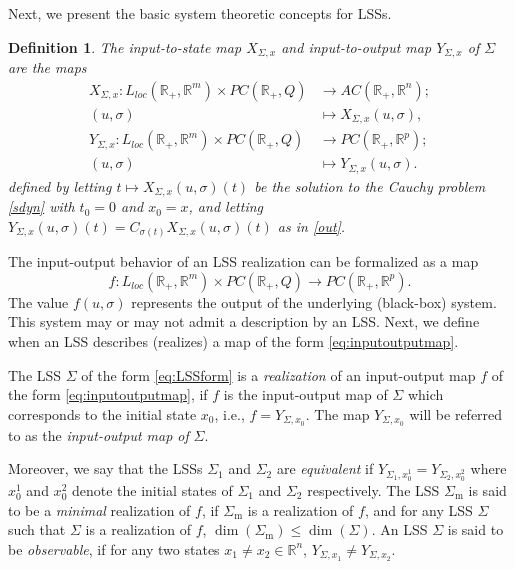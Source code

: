 \documentclass[journal]{IEEEtran}
\newtheorem{Definition}{Definition}
\begin{document}
Next, we present the basic system theoretic concepts for LSSs.

\begin{Definition}\label{def:stateandoutput}
The \emph{input-to-state} map $X_{\Sigma,x}$ and \emph{input-to-output} map $Y_{\Sigma,x}$ of $\Sigma$ are the maps 
	\begin{align*}
		X_{\Sigma,x}: L_{loc}(\mathbb{R}_+,\mathbb{R}^m) \times PC(\mathbb{R}_+,Q) & \rightarrow AC(\mathbb{R}_+,\mathbb{R}^n); \\
		(u,\sigma) & \mapsto X_{\Sigma,x}(u,\sigma), \\ 
		Y_{\Sigma,x}: L_{loc}(\mathbb{R}_+,\mathbb{R}^m) \times PC(\mathbb{R}_+,Q) & \rightarrow PC(\mathbb{R}_+,\mathbb{R}^p); \\
		(u,\sigma) & \mapsto Y_{\Sigma,x}(u,\sigma).
	\end{align*}
	defined by letting $t\mapsto X_{\Sigma,x}(u,\sigma)(t)$ be the solution to the Cauchy problem \eqref{sdyn} with $t_0=0$ and $x_0=x$, and letting $Y_{\Sigma,x}(u,\sigma)(t)=C_{\sigma(t)}X_{\Sigma,x}(u,\sigma)(t)$ as in \eqref{out}.
\end{Definition}

The input-output behavior of an LSS realization can be formalized as a map
\begin{equation} \label{eq:inputoutputmap}
	f: L_{loc}(\mathbb{R}_+,\mathbb{R}^m) \times PC(\mathbb{R}_+,Q) \rightarrow PC(\mathbb{R}_+,\mathbb{R}^p).
\end{equation}
The value $f(u,\sigma)$ represents the output of the underlying (black-box) system. This system may or may not admit a description by an LSS. Next, we define when an LSS describes (realizes) a map of the form \eqref{eq:inputoutputmap}.

The LSS $\Sigma$ of the form \eqref{eq:LSSform} is a \emph{realization} of an input-output map $f$ of the form \eqref{eq:inputoutputmap}, if $f$ is the input-output map of $\Sigma$ which corresponds to the initial state $x_0$, i.e., $f=Y_{\Sigma,x_0}$. The map $Y_{\Sigma,x_0}$ will be referred to as the \emph{input-output map of} $\Sigma$.

Moreover, we say that the LSSs $\Sigma_1$ and $\Sigma_2$ are \emph{equivalent} if $Y_{\Sigma_1,x_0^1}=Y_{\Sigma_2,x_0^2}$ where $x_0^1$ and $x_0^2$ denote the initial states of $\Sigma_1$ and $\Sigma_2$ respectively. The LSS $\Sigma_{\mathrm m}$ is said to be a \emph{minimal} realization of $f$, if $\Sigma_{\mathrm m}$ is a realization of $f$, and for any LSS $\Sigma$ such that $\Sigma$ is a realization of $f$, $\dim (\Sigma_{\mathrm m}) \le \dim (\Sigma)$. An LSS $\Sigma$ is said to be \emph{observable}, if for any two states $x_{1}\neq x_{2} \in \mathbb{R}^n$, $Y_{\Sigma,x_1} \neq Y_{\Sigma,x_2}$.
\end{document}
